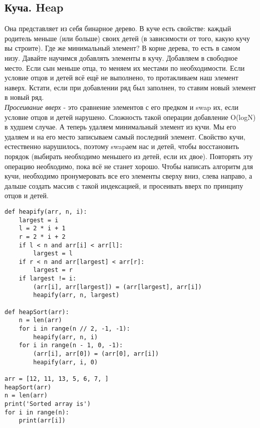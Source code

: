 \documentclass[a4paper,12pt]{article}
\begin{document}
\subsection{Куча. Heap}
Она представляет из себя бинарное дерево. В куче есть свойстве: каждый родитель меньше (или больше) своих детей (в зависимости от того, какую кучу вы строите). Где же минимальный элемент? В корне дерева, то есть в самом низу. Давайте научимся добавлять элементы в кучу. Добавляем в свободное место. Если сын меньше отца, то меняем их местами по необходимости. Если условие отцов и детей всё ещё не выполнено, то протакливаем наш элемент наверх. Кстати, если при добавлении ряд был заполнен, то ставим новый элемент в новый ряд. \\
\textit{Просеивание вверх} - это сравнение элементов с его предком и swap их, если условие отцов и детей нарушено. Сложность такой операции добавление O(logN) в худшем случае. А теперь удаляем минимальный элемент из кучи. Мы его удаляем и на его место записываем самый последний элемент. Свойство кучи, естественно нарушилось, поэтому swapаем нас и детей, чтобы восстановить порядок (выбирать необходимо меньшего из детей, если их двое). Повторять эту операцию необходимо, пока всё не станет хорошо. Чтобы написать алгоритм для кучи, необходимо пронумеровать все его элементы сверху вниз, слева направо, а дальше создать массив с такой индексацией, и просеивать вверх по принципу отцов и детей.
\begin{verbatim}
def heapify(arr, n, i):
    largest = i 
    l = 2 * i + 1
    r = 2 * i + 2 
    if l < n and arr[i] < arr[l]:
        largest = l
    if r < n and arr[largest] < arr[r]:
        largest = r
    if largest != i:
        (arr[i], arr[largest]) = (arr[largest], arr[i]) 
        heapify(arr, n, largest)

def heapSort(arr):
    n = len(arr) 
    for i in range(n // 2, -1, -1):
        heapify(arr, n, i) 
    for i in range(n - 1, 0, -1):
        (arr[i], arr[0]) = (arr[0], arr[i]) 
        heapify(arr, i, 0)

arr = [12, 11, 13, 5, 6, 7, ]
heapSort(arr)
n = len(arr)
print('Sorted array is')
for i in range(n):
    print(arr[i])
\end{verbatim}
\end{document}
